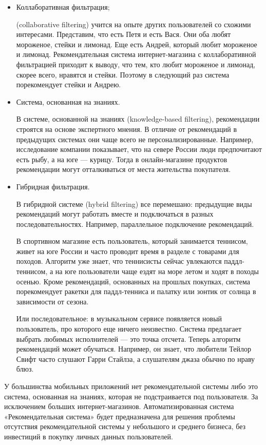 \begin{itemize}
    \item Коллаборативная фильтрация; \par
    (collaborative filtering) учится на опыте других пользователей со схожими интересами.
    Представим, что есть Петя и есть Вася.
    Они оба любят мороженое, стейки и лимонад.
    Еще есть Андрей, который любит мороженое и лимонад.
    Рекомендательная система интернет-магазина с коллаборативной фильтрацией приходит к выводу, что тем, кто любит
    мороженое и лимонад, скорее всего, нравятся и стейки.
    Поэтому в следующий раз система порекомендует стейки и Андрею.
    \item Система, основанная на знаниях. \par
    В системе, основанной на знаниях (knowledge-based filtering), рекомендации строятся на основе экспертного мнения.
    В отличие от рекомендаций в предыдущих системах они чаще всего не персонализированные.
    Например, исследование компании показывает, что на севере России люди предпочитают есть рыбу, а на юге — курицу.
    Тогда в онлайн-магазине продуктов рекомендации могут отталкиваться от места жительства покупателя.
    \item Гибридная фильтрация. \par
    В гибридной системе (hybrid filtering) все перемешано: предыдущие виды рекомендаций могут работать вместе и
    подключаться в разных последовательностях.
    Например, параллельное подключение рекомендаций. \par
    В спортивном магазине есть пользователь, который занимается теннисом, живет на юге России и часто проводит время в
    разделе с товарами для походов.
    Алгоритм уже знает, что теннисисты сейчас увлекаются паддл-теннисом, а на юге пользователи чаще ездят на море летом
    и ходят в походы осенью.
    Кроме рекомендаций, основанных на прошлых покупках, система порекомендует ракетки для паддл-тенниса и палатку или
    зонтик от солнца в зависимости от сезона. \par
    Или последовательное: в музыкальном сервисе появляется новый пользователь, про которого еще ничего неизвестно.
    Система предлагает выбрать любимых исполнителей — это точка отсчета.
    Теперь алгоритм рекомендаций может обучаться.
    Например, он знает, что любители Тейлор Свифт часто слушают Гарри Стайлза, а слушателям джаза обычно по нраву блюз.
\end{itemize}


У большинства мобильных приложений нет рекомендательной системы либо это система, основанная на знаниях,
которая не подстраивается под пользователя.
За исключением больших интернет-магазинов.
Автоматизированная система «Рекомендательная система» будет предназначена для решения проблемы отсутствия
рекомендательной системы у небольшого и среднего бизнеса, без инвестиций в покупку личных данных пользователей.